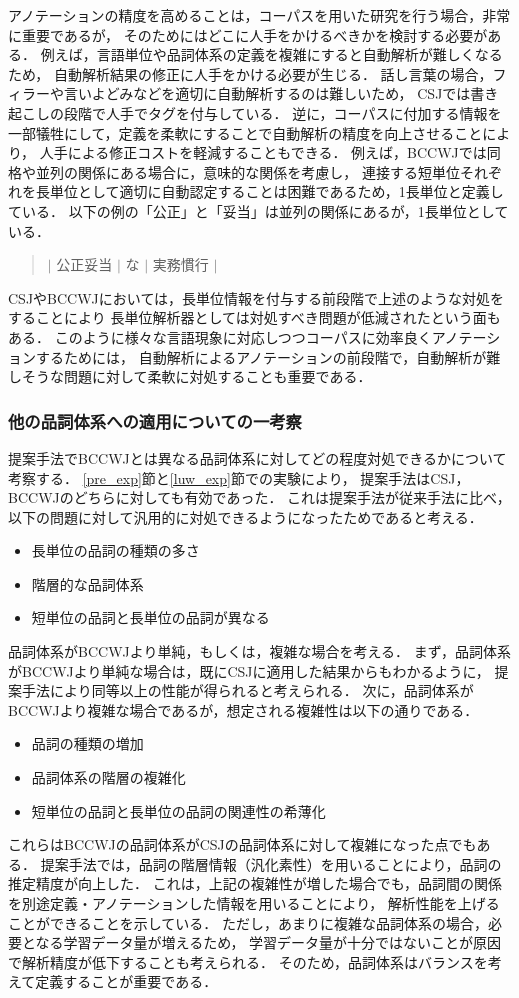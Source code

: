 \documentclass[japanese]{jnlp_1.4}
\begin{document}
アノテーションの精度を高めることは，コーパスを用いた研究を行う場合，非常に重要であるが，
そのためにはどこに人手をかけるべきかを検討する必要がある．
例えば，言語単位や品詞体系の定義を複雑にすると自動解析が難しくなるため，
自動解析結果の修正に人手をかける必要が生じる．
話し言葉の場合，フィラーや言いよどみなどを適切に自動解析するのは難しいため，
CSJでは書き起こしの段階で人手でタグを付与している．
逆に，コーパスに付加する情報を一部犠牲にして，定義を柔軟にすることで自動解析の精度を向上させることにより，
人手による修正コストを軽減することもできる．
例えば，BCCWJでは同格や並列の関係にある場合に，意味的な関係を考慮し，
連接する短単位それぞれを長単位として適切に自動認定することは困難であるため，1長単位と定義している．
以下の例の「公正」と「妥当」は並列の関係にあるが，1長単位としている．
\begin{quote}
$|$ 公正妥当 $|$ な $|$ 実務慣行 $|$
\end{quote}
CSJやBCCWJにおいては，長単位情報を付与する前段階で上述のような対処をすることにより
長単位解析器としては対処すべき問題が低減されたという面もある．
このように様々な言語現象に対応しつつコーパスに効率良くアノテーションするためには，
自動解析によるアノテーションの前段階で，自動解析が難しそうな問題に対して柔軟に対処することも重要である．


\subsubsection{他の品詞体系への適用についての一考察}

提案手法でBCCWJとは異なる品詞体系に対してどの程度対処できるかについて考察する．
\ref{pre_exp}節と\ref{luw_exp}節での実験により，
提案手法はCSJ，BCCWJのどちらに対しても有効であった．
これは提案手法が従来手法に比べ，以下の問題に対して汎用的に対処できるようになったためであると考える．
\begin{itemize}
\item 長単位の品詞の種類の多さ
\item 階層的な品詞体系
\item 短単位の品詞と長単位の品詞が異なる
\end{itemize}
品詞体系がBCCWJより単純，もしくは，複雑な場合を考える．
まず，品詞体系がBCCWJより単純な場合は，既にCSJに適用した結果からもわかるように，
提案手法により同等以上の性能が得られると考えられる．
次に，品詞体系がBCCWJより複雑な場合であるが，想定される複雑性は以下の通りである．
\begin{itemize}
\item 品詞の種類の増加
\item 品詞体系の階層の複雑化
\item 短単位の品詞と長単位の品詞の関連性の希薄化
\end{itemize}
これらはBCCWJの品詞体系がCSJの品詞体系に対して複雑になった点でもある．
提案手法では，品詞の階層情報（汎化素性）を用いることにより，品詞の推定精度が向上した．
これは，上記の複雑性が増した場合でも，品詞間の関係を別途定義・アノテーションした情報を用いることにより，
解析性能を上げることができることを示している．
ただし，あまりに複雑な品詞体系の場合，必要となる学習データ量が増えるため，
学習データ量が十分ではないことが原因で解析精度が低下することも考えられる．
そのため，品詞体系はバランスを考えて定義することが重要である．
\end{document}
